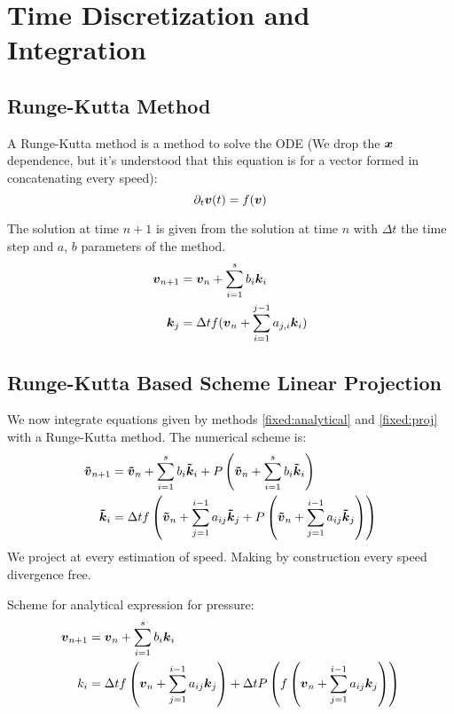 \section{Time Discretization and Integration}
\label{fixed:timesec}
\subsection{Runge-Kutta Method}

A Runge-Kutta method is a method to solve the ODE (We drop the ${\boldsymbol {x}}$ dependence, but it's understood that this equation is for a vector formed in concatenating every speed):
\begin{equation}
\partial_t {\boldsymbol {v}}(t)=f({\boldsymbol {v}})
\end{equation}

The solution at time $n+1$ is given from the solution at time $n$ with $\Delta t$ the time step and $a$, $b$ parameters of the method.
\begin{subequations}
\begin{align}
	{\boldsymbol {v}}_{n+1}&={\boldsymbol {v}}_{n}+\sum_{i=1}^{s}b_{i}{\boldsymbol {k}}_{i}\\
	{\boldsymbol {k}}_{j}&=\Delta t f({\boldsymbol {v}}_{n}+\sum_{i=1}^{j-1}a_{j,i}{\boldsymbol {k}}_{i})
\end{align}
\end{subequations}

\subsection{Runge-Kutta Based Scheme Linear Projection}
\label{fixed:sect:runge-kutta}
We now integrate equations given by methods \ref{fixed:analytical} and \ref{fixed:proj} with a Runge-Kutta method.
The numerical scheme is:
\begin{subequations}
\begin{align}
{\boldsymbol {\tilde{v}}}_{n+1}&={\boldsymbol {\tilde{v}}}_{n}+\sum_{i=1}^{s}b_{i}{\boldsymbol {\tilde{k}}}_{i}+P\left({\boldsymbol {\tilde{v}}}_{n}+\sum_{i=1}^{s}b_{i}{\boldsymbol {\tilde{k}}}_{i}\right)\\
{\boldsymbol {\tilde{k}}}_{i}&=\Delta t f\left({\boldsymbol {\tilde{v}}}_{n}+\sum_{j=1}^{i-1}a_{ij}{\boldsymbol {\tilde{k}}}_{j}+P\left({\boldsymbol {\tilde{v}}}_{n}+\sum_{j=1}^{i-1}a_{ij}{\boldsymbol {\tilde{k}}}_{j}\right)\right)
\end{align}
\end{subequations}
We project at every estimation of speed. Making by construction every speed divergence free.

Scheme for analytical expression for pressure:
\begin{subequations}
\begin{align}
	{\boldsymbol {v}}_{n+1}&={\boldsymbol {v}}_{n}+\sum_{i=1}^{s}b_{i}{\boldsymbol {k}}_{i}\\
	k_{i}&=\Delta t f\left({\boldsymbol {v}}_{n}+\sum_{j=1}^{i-1}a_{ij}{\boldsymbol {k}}_{j}\right)+\Delta t P\left(f\left({\boldsymbol {v}}_{n}+\sum_{j=1}^{i-1}a_{ij}{\boldsymbol {k}}_{j}\right)\right)
\end{align}
\end{subequations}

